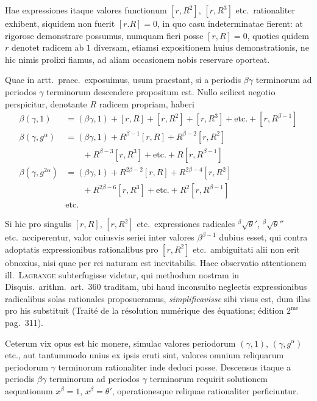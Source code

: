 Hae expressiones itaque valores functionum $[r,R^2]$, $[r,R^3]$ etc.\ rationaliter exhibent, siquidem non fuerit $[r.R]=0$, in quo casu indeterminatae fierent: at rigorose demonstrare possumus, numquam fieri posse $[r,R]=0$, quoties quidem $r$ denotet radicem ab $1$ diversam, etiamsi expositionem huius demonstrationis, ne hic nimis prolixi fiamus, ad aliam occasionem nobis reservare oporteat.

Quae in artt.\ praec.\ exposuimus, usum praestant, si a periodis $\beta\gamma$ terminorum ad periodos $\gamma$ terminorum descendere propositum est. Nullo scilicet negotio perspicitur, denotante $R$ radicem propriam, haberi
\[
\begin{aligned}
\beta(\gamma,1)&=(\beta\gamma,1)+[r,R]+[r,R^2]+[r,R^3]+\text{etc.}+[r,R^{\beta-1}]\\
\beta(\gamma,g^\alpha)&=(\beta\gamma,1)+R^{\beta-1}[r,R]+R^{\beta-2}[r,R^2]\\
&\qquad{}+R^{\beta-3}[r,R^3]+\text{etc.}+R[r,R^{\beta-1}]\\
\beta(\gamma,g^{2\alpha})&=(\beta\gamma,1)+R^{2\beta-2}[r,R]+R^{2\beta-4}[r,R^2]\\
&\qquad{}+R^{2\beta-6}[r,R^3]+\text{etc.}+R^2[r,R^{\beta-1}]\\
&\text{etc.}
\end{aligned}
\]

Si hic pro singulis $[r,R]$, $[r,R^2]$ etc.\ expressiones radicales ${}^{\beta}\!\surd\theta'$, ${}^{\beta}\!\surd\theta''$ etc.\ acciperentur, valor cuiusvis seriei inter valores $\beta^{\beta-1}$ dubius esset, qui contra adoptatis expressionibus rationalibus pro $[r,R^2]$ etc.\ ambiguitati alii non erit obnoxius, nisi quae per rei naturam est inevitabilis. Haec observatio attentionem ill.\ \textsc{Lagrange} subterfugisse videtur, qui methodum nostram in Disquis.\ arithm.\ art.\ 360 traditam, ubi haud inconsulto neglectis expressionibus radicalibus solas rationales proposueramus, \emph{simplificavisse} sibi visus est, dum illas pro his substituit (Traité de la résolution numérique des équations; édition $2^{\mathrm{me}}$ pag.\ 311).

Ceterum vix opus est hic monere, simulac valores periodorum $(\gamma,1)$, $(\gamma,g^\alpha)$ etc., aut tantummodo unius ex ipsis eruti sint, valores omnium reliquarum periodorum $\gamma$ terminorum rationaliter inde deduci posse. Descensus itaque a periodis $\beta\gamma$ terminorum ad periodos $\gamma$ terminorum requirit solutionem aequationum $x^\beta=1$, $x^\beta=\theta'$, operationesque reliquae rationaliter perficiuntur.
